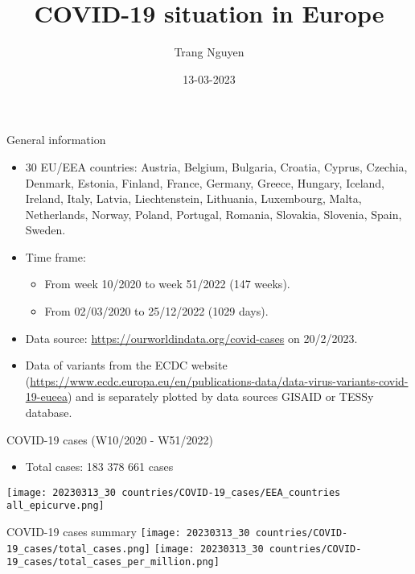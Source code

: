 \documentclass{beamer}
\title{COVID-19 situation in Europe}
\author{Trang Nguyen}
\institute{UHasselt}
\date{13-03-2023}
\begin{document}
\frame{\titlepage}

\begin{frame}{General information}
\begin{itemize}
    \item 30 EU/EEA countries: Austria, Belgium, Bulgaria, Croatia, Cyprus, Czechia, Denmark, Estonia, Finland, France, Germany, Greece, Hungary, \alert{Iceland}, Ireland, Italy, Latvia, \alert{Liechtenstein}, Lithuania, Luxembourg, Malta, Netherlands, \alert{Norway}, Poland, Portugal, Romania, Slovakia, Slovenia, Spain, Sweden. 
    \item Time frame:
    \begin{itemize}
        \item From week 10/2020 to week 51/2022 (147 weeks). 
        \item From 02/03/2020 to 25/12/2022 (1029 days).
    \end{itemize}
    \item Data source: \url{https://ourworldindata.org/covid-cases} on 20/2/2023.
    \item Data of variants from the ECDC website (\url{https://www.ecdc.europa.eu/en/publications-data/data-virus-variants-covid-19-eueea}) and is separately plotted by data sources GISAID or TESSy database.
\end{itemize}
\end{frame}


\begin{frame}{COVID-19 cases (W10/2020 - W51/2022)}
    \begin{itemize}
        \item Total cases: 183 378 661 cases
    \end{itemize}
\begin{center}
\texttt{[image: 20230313\_30 countries/COVID-19\_cases/EEA\_countries all\_epicurve.png]}
\end{center}
\end{frame}

\begin{frame}{COVID-19 cases summary}
\texttt{[image: 20230313\_30 countries/COVID-19\_cases/total\_cases.png]}%
\texttt{[image: 20230313\_30 countries/COVID-19\_cases/total\_cases\_per\_million.png]}
\end{frame}
\end{document}
